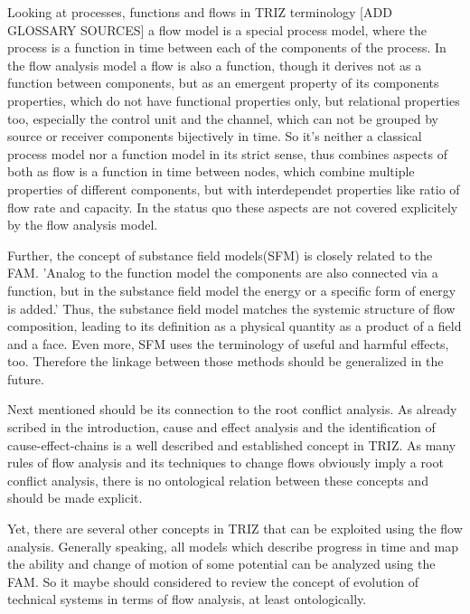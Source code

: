 \documentclass[a4paper,11pt]{article}
\begin{document}
        Looking at processes, functions and flows in TRIZ terminology [ADD GLOSSARY SOURCES]\cite{WebinarNotes} a flow model is a special process model, where the process is a
        function in time between each of the components of the process. \cite{SysInno2017} In the flow analysis model a flow is also a function, though it derives not
        as a function between components, but as an emergent property of its components properties, which do not have functional properties only, but relational
        properties too, especially the control unit and the channel, which can not be grouped by source or receiver components bijectively in time. 
        So it's neither a classical process model nor a function model in its strict sense, thus combines aspects of both as flow is a function in time between nodes, 
        which combine multiple properties of different components, but with interdependet properties like ratio of flow rate and capacity. In the status
        quo these aspects are not covered explicitely by the flow analysis model.

        Further, the concept of substance field models(SFM) is closely related to the FAM. 'Analog to the function model the components are also connected
        via a function, but in the substance field model the energy or a specific form of energy is added.' \cite{SysInno2017} Thus, the substance field model
        matches the systemic structure of flow composition, leading to its definition as a physical quantity as a product of a field and a face. \cite{Fluss(Physik)}
        Even more, SFM uses the terminology of useful and harmful effects, too. \cite{SysInno2017} Therefore the linkage between those methods should be generalized in the
        future.

        Next mentioned should be its connection to the root conflict analysis. As already scribed in the introduction, cause and effect analysis and the
        identification of cause-effect-chains is a well described and established concept in TRIZ. As many rules of flow analysis and its techniques to
        change flows obviously imply a root conflict analysis, there is no ontological relation between these concepts and should be made explicit. 
        
        Yet, there are several other concepts in TRIZ that can be exploited using the flow analysis. Generally speaking, all models which describe 
        progress in time and map the ability and change of motion of some potential can be analyzed using the FAM. So it maybe should considered to
        review the concept of evolution of technical systems in terms of flow analysis, at least ontologically.
        
\end{document}
